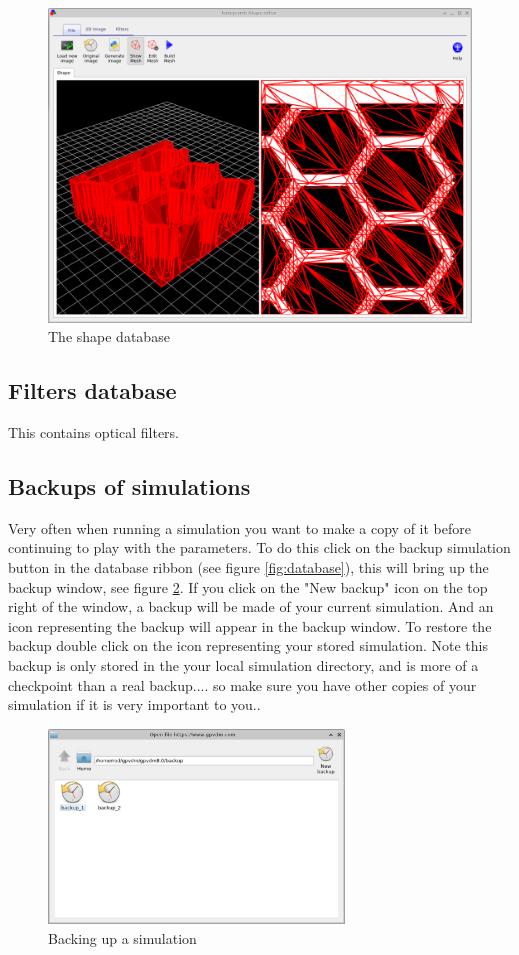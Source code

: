 \begin{figure}[H]
\centering
\includegraphics[width=\textwidth,height=0.7\textwidth]{./images/shape_db.png}
\caption{The shape database}
\label{fig:shapedb}
\end{figure}

\subsection{Filters database}
This contains optical filters.

\subsection{Backups of simulations}
Very often when running a simulation you want to make a copy of it before continuing to play with the parameters.  To do this click on the backup simulation button in the database ribbon (see figure \ref{fig:database}), this will bring up the backup window, see figure \ref{fig:backup}. If you click on the "New backup" icon on the top right of the window, a backup will be made of your current simulation.  And an icon representing the backup will appear in the backup window.  To restore the backup double click on the icon representing your stored simulation. Note this backup is only stored in the your local simulation directory, and is more of a checkpoint than a real backup.... so make sure you have other copies of your simulation if it is very important to you..

\begin{figure}[H]
\centering
\includegraphics[width=0.7\textwidth]{./images/backup.png}
\caption{Backing up a simulation}
\label{fig:backup}
\end{figure}

